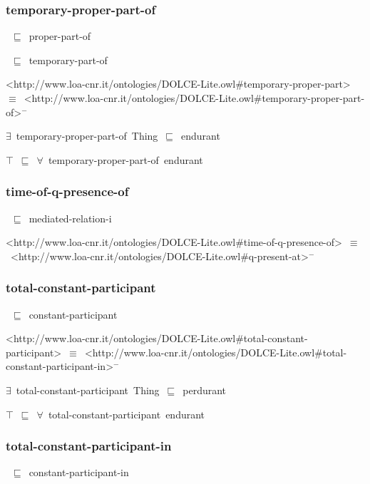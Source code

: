\documentclass{article}
\begin{document}
\subsubsection*{temporary-proper-part-of}

~\ensuremath{\sqsubseteq}~proper-part-of

~\ensuremath{\sqsubseteq}~temporary-part-of

<http://www.loa-cnr.it/ontologies/DOLCE-Lite.owl#temporary-proper-part>~\ensuremath{\equiv}~<http://www.loa-cnr.it/ontologies/DOLCE-Lite.owl#temporary-proper-part-of>\ensuremath{^-}

\ensuremath{\exists}~temporary-proper-part-of~Thing~\ensuremath{\sqsubseteq}~endurant

\ensuremath{\top}~\ensuremath{\sqsubseteq}~\ensuremath{\forall}~temporary-proper-part-of~endurant

\subsubsection*{time-of-q-presence-of}

~\ensuremath{\sqsubseteq}~mediated-relation-i

<http://www.loa-cnr.it/ontologies/DOLCE-Lite.owl#time-of-q-presence-of>~\ensuremath{\equiv}~<http://www.loa-cnr.it/ontologies/DOLCE-Lite.owl#q-present-at>\ensuremath{^-}

\subsubsection*{total-constant-participant}

~\ensuremath{\sqsubseteq}~constant-participant

<http://www.loa-cnr.it/ontologies/DOLCE-Lite.owl#total-constant-participant>~\ensuremath{\equiv}~<http://www.loa-cnr.it/ontologies/DOLCE-Lite.owl#total-constant-participant-in>\ensuremath{^-}

\ensuremath{\exists}~total-constant-participant~Thing~\ensuremath{\sqsubseteq}~perdurant

\ensuremath{\top}~\ensuremath{\sqsubseteq}~\ensuremath{\forall}~total-constant-participant~endurant

\subsubsection*{total-constant-participant-in}

~\ensuremath{\sqsubseteq}~constant-participant-in
\end{document}
